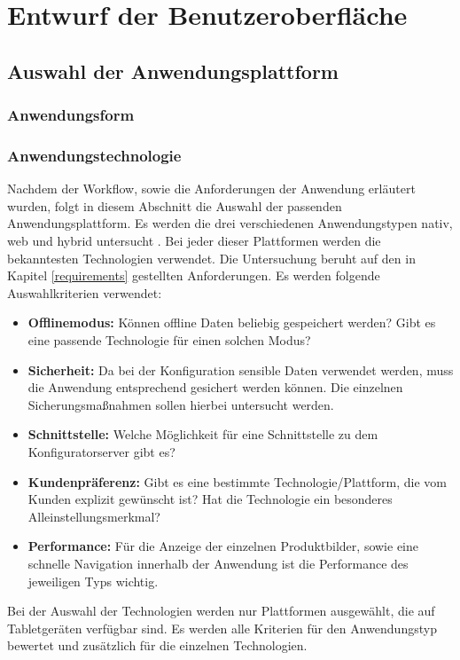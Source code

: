 \chapter{Entwurf der Benutzeroberfläche}\label{chapter_4}


\section{Auswahl der Anwendungsplattform}

\subsection{Anwendungsform}
\subsection{Anwendungstechnologie}
Nachdem der Workflow, sowie die Anforderungen der Anwendung erläutert wurden, folgt in diesem Abschnitt die Auswahl der passenden Anwendungsplattform. Es werden die drei verschiedenen Anwendungstypen nativ, web und hybrid untersucht \cite{bib:mobilePlattform}. Bei jeder dieser Plattformen werden die bekanntesten Technologien verwendet. Die Untersuchung beruht auf den in Kapitel \ref{requirements} gestellten Anforderungen. Es werden folgende Auswahlkriterien verwendet:
\begin{itemize}
        \item \textbf{Offlinemodus:} Können offline Daten beliebig gespeichert werden? Gibt es eine passende Technologie für einen solchen Modus?
        
        \item \textbf{Sicherheit:} Da bei der Konfiguration sensible Daten verwendet werden, muss die Anwendung entsprechend gesichert werden können. Die einzelnen Sicherungsmaßnahmen sollen hierbei untersucht werden.
        
        \item \textbf{Schnittstelle:} Welche Möglichkeit für eine Schnittstelle zu dem Konfiguratorserver gibt es? 
        
        \item \textbf{Kundenpräferenz:} Gibt es eine bestimmte Technologie/Plattform, die vom Kunden explizit gewünscht ist? Hat die Technologie ein besonderes Alleinstellungsmerkmal?
        
        \item \textbf{Performance:} Für die Anzeige der einzelnen Produktbilder, sowie eine schnelle Navigation innerhalb der Anwendung ist die Performance des jeweiligen Typs wichtig.      
        
\end{itemize}
Bei der Auswahl der Technologien werden nur Plattformen ausgewählt, die auf Tabletgeräten verfügbar sind. Es werden alle Kriterien für den Anwendungstyp bewertet und zusätzlich für die einzelnen Technologien.


